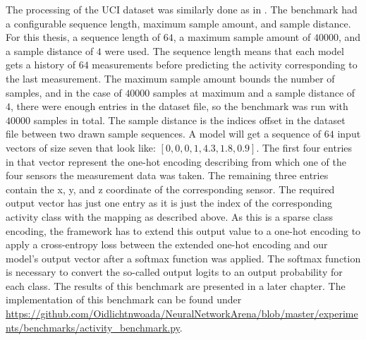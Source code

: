 \documentclass[draft,final]{vutinfth} %
\begin{document}
    The processing of the UCI dataset was similarly done as in \cite{ODELSTM}.
    The benchmark had a configurable sequence length, maximum sample amount, and sample distance.
    For this thesis, a sequence length of $64$, a maximum sample amount of $40000$, and a sample distance of $4$ were used.
    The sequence length means that each model gets a history of $64$ measurements before predicting the activity corresponding to the last measurement.
    The maximum sample amount bounds the number of samples, and in the case of $40000$ samples at maximum and a sample distance of $4$, there were enough entries in the dataset file, so the benchmark was run with $40000$ samples in total.
    The sample distance is the indices offset in the dataset file between two drawn sample sequences.
    A model will get a sequence of $64$ input vectors of size seven that look like: $[0,0,0,1,4.3,1.8,0.9]$.
    The first four entries in that vector represent the one-hot encoding describing from which one of the four sensors the measurement data was taken.
    The remaining three entries contain the x, y, and z coordinate of the corresponding sensor.
    The required output vector has just one entry as it is just the index of the corresponding activity class with the mapping as described above.
    As this is a sparse class encoding, the framework has to extend this output value to a one-hot encoding to apply a cross-entropy loss between the extended one-hot encoding and our model's output vector after a softmax function was applied.
    The softmax function is necessary to convert the so-called output logits to an output probability for each class.
    The results of this benchmark are presented in a later chapter.
    The implementation of this benchmark can be found under \url{https://github.com/Oidlichtnwoada/NeuralNetworkArena/blob/master/experiments/benchmarks/activity_benchmark.py}.
    
\end{document}
